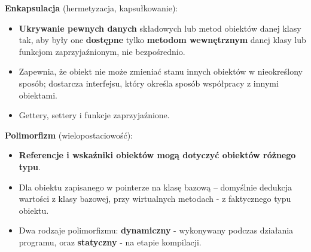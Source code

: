 \documentclass[main.tex]{subfiles}
\begin{document}
    \noindent \textbf{Enkapsulacja} (hermetyzacja, kapsułkowanie):
    \begin{itemize}[noitemsep]
        \item \textbf{Ukrywanie pewnych danych} składowych lub metod obiektów danej klasy tak, aby były one
        \textbf{dostępne} tylko \textbf{metodom wewnętrznym} danej klasy lub funkcjom zaprzyjaźnionym, nie bezpośrednio.
        \item Zapewnia, że obiekt nie może zmieniać stanu innych obiektów w nieokreślony sposób; dostarcza interfejsu,
        który określa sposób współpracy z innymi obiektami.
        \item Gettery, settery i funkcje zaprzyjaźnione.
    \end{itemize}

    \noindent \textbf{Polimorfizm} (wielopostaciowość):
    \begin{itemize}[noitemsep]
        \item \textbf{Referencje i wskaźniki obiektów mogą dotyczyć obiektów różnego typu}.
        \item Dla obiektu zapisanego w pointerze na klasę bazową -- domyślnie dedukcja wartości z klasy bazowej, przy
        wirtualnych metodach - z faktycznego typu obiektu.
        \item Dwa rodzaje polimorfizmu: \textbf{dynamiczny} - wykonywany podczas działania programu, oraz
        \textbf{statyczny} - na etapie kompilacji.
    \end{itemize}
\end{document}
